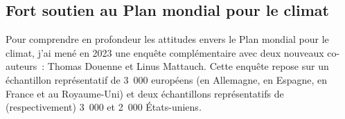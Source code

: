 \documentclass[a5paper,french,openany]{memoir}
\begin{document}

\subsection{Fort soutien au Plan mondial pour le climat}

Pour comprendre en profondeur les attitudes envers le Plan mondial pour le climat, j'ai mené en 2023 une enquête complémentaire avec deux nouveaux co-auteurs~: Thomas Douenne et Linus Mattauch. Cette enquête repose sur un échantillon représentatif de 3~000 européens (en Allemagne, en Espagne, en France et au Royaume-Uni) et deux échantillons représentatifs de (respectivement) 3~000 et 2~000 États-uniens. 
\end{document}
